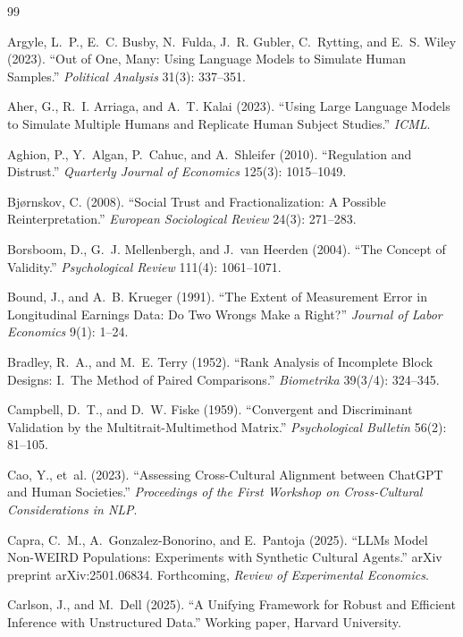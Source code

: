 \documentclass[11pt,letterpaper]{article}
\begin{document}
\begin{thebibliography}{99}

Argyle, L.~P., E.~C. Busby, N.~Fulda, J.~R. Gubler, C.~Rytting, and E.~S. Wiley (2023).
``Out of One, Many: Using Language Models to Simulate Human Samples.''
\textit{Political Analysis} 31(3): 337--351.

Aher, G., R.~I. Arriaga, and A.~T. Kalai (2023).
``Using Large Language Models to Simulate Multiple Humans and Replicate Human Subject Studies.''
\textit{ICML}.

Aghion, P., Y.~Algan, P.~Cahuc, and A.~Shleifer (2010).
``Regulation and Distrust.''
\textit{Quarterly Journal of Economics} 125(3): 1015--1049.

Bj\o rnskov, C. (2008).
``Social Trust and Fractionalization: A Possible Reinterpretation.''
\textit{European Sociological Review} 24(3): 271--283.

Borsboom, D., G.~J. Mellenbergh, and J.~van Heerden (2004).
``The Concept of Validity.''
\textit{Psychological Review} 111(4): 1061--1071.

Bound, J., and A.~B. Krueger (1991).
``The Extent of Measurement Error in Longitudinal Earnings Data: Do Two Wrongs Make a Right?''
\textit{Journal of Labor Economics} 9(1): 1--24.

Bradley, R.~A., and M.~E. Terry (1952).
``Rank Analysis of Incomplete Block Designs: I.~The Method of Paired Comparisons.''
\textit{Biometrika} 39(3/4): 324--345.

Campbell, D.~T., and D.~W. Fiske (1959).
``Convergent and Discriminant Validation by the Multitrait-Multimethod Matrix.''
\textit{Psychological Bulletin} 56(2): 81--105.

Cao, Y., et~al. (2023).
``Assessing Cross-Cultural Alignment between ChatGPT and Human Societies.''
\textit{Proceedings of the First Workshop on Cross-Cultural Considerations in NLP}.

Capra, C.~M., A.~Gonzalez-Bonorino, and E.~Pantoja (2025).
``LLMs Model Non-WEIRD Populations: Experiments with Synthetic Cultural Agents.''
arXiv preprint arXiv:2501.06834. Forthcoming, \textit{Review of Experimental Economics}.

Carlson, J., and M.~Dell (2025).
``A Unifying Framework for Robust and Efficient Inference with Unstructured Data.''
Working paper, Harvard University.


\end{thebibliography}
\end{document}
